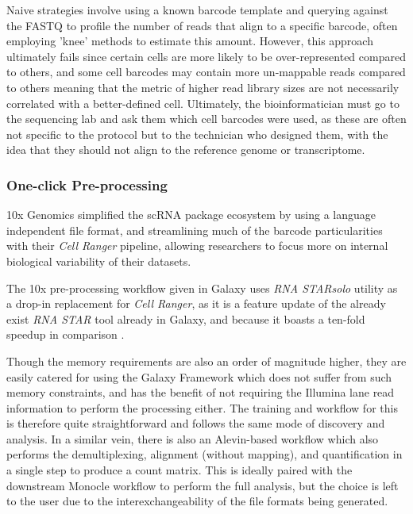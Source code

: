 \documentclass[a4paper,num-refs]{oup-contemporary}
\newcommand{\prog}[1]{\textit{#1}}
\begin{document}
Naive strategies involve using a known barcode template and querying against the FASTQ to profile the number of reads that align to a specific barcode, often employing 'knee' methods to estimate this amount. However, this approach ultimately fails since certain cells are more likely to be over-represented compared to others, and some cell barcodes may contain more un-mappable reads compared to others meaning that the metric of higher read library sizes are not necessarily correlated with a better-defined cell. Ultimately, the bioinformatician must go to the sequencing lab and ask them which cell barcodes were used, as these are often not specific to the protocol but to the technician who designed them, with the idea that they should not align to the reference genome or transcriptome.

\subsubsection{One-click Pre-processing}

10x Genomics simplified the scRNA package ecosystem by using a language independent file format, and streamlining much of the barcode particularities with their \prog{Cell Ranger} pipeline, allowing researchers to focus more on internal biological variability of their datasets.

The 10x pre-processing workflow given in Galaxy uses \prog{RNA STARsolo} utility as a drop-in replacement for \prog{Cell Ranger}, as it is a feature update of the already exist \prog{RNA STAR} tool already in Galaxy, and because it boasts a ten-fold speedup in comparison \cite{}.

Though the memory requirements are also an order of magnitude higher, they are easily catered for using the Galaxy Framework which does not suffer from such memory constraints, and has the benefit of not requiring the Illumina lane read information to perform the processing either. The training and workflow for this is therefore quite straightforward and follows the same mode of discovery and analysis.
In a similar vein, there is also an Alevin-based workflow which also performs the demultiplexing, alignment (without mapping), and quantification in a single step to produce a count matrix. This is ideally paired with the downstream Monocle workflow to perform the full analysis, but the choice is left to the user due to the interexchangeability of the file formats being generated.
\end{document}
